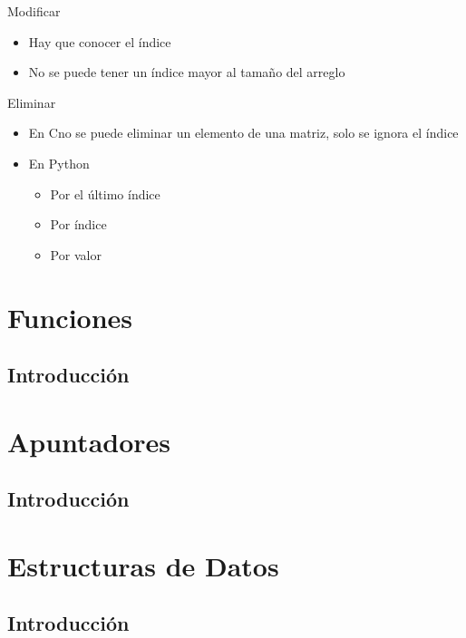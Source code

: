 \documentclass{beamer}
\newcommand{\Rplus}{\protect\hspace{-.1em}\protect\raisebox{.35ex}{\smaller{\smaller\textbf{+}}}}
\newcommand{\Cpp}{\mbox{C\Rplus\Rplus}\hspace{3pt}}
\begin{document}
\begin{frame}{Modificar}
	\begin{itemize}
		\item Hay que conocer el \'indice
		\item No se puede tener un \'indice mayor al tamaño del arreglo
	\end{itemize}
\end{frame}

\begin{frame}{Eliminar}
	\begin{itemize}
		\item En \Cpp no se puede eliminar un elemento de una matriz, solo se ignora el \'indice 
		\item En Python
		\begin{itemize}
			\item Por el \'ultimo \'indice
			\item Por \'indice
			\item Por valor
		\end{itemize}
	\end{itemize}
\end{frame}

\section{Funciones}
\subsection{Introducci\'on}

\section{Apuntadores}
\subsection{Introducci\'on}

\section{Estructuras de Datos}
\subsection{Introducci\'on}
\end{document}
